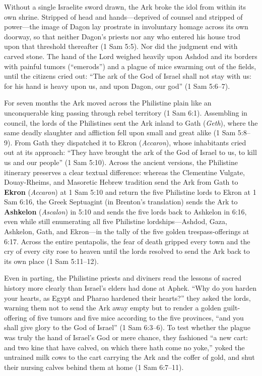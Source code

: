 Without a single Israelite sword drawn, the Ark broke the idol from within its own shrine. Stripped of head and hands---deprived of counsel and stripped of power---the image of Dagon lay prostrate in involuntary homage across its own doorway, so that neither Dagon's priests nor any who entered his house trod upon that threshold thereafter (1 Sam 5:5). Nor did the judgment end with carved stone. The hand of the Lord weighed heavily upon Ashdod and its borders with painful tumors (``emerods'') and a plague of mice swarming out of the fields, until the citizens cried out: ``The ark of the God of Israel shall not stay with us: for his hand is heavy upon us, and upon Dagon, our god'' (1 Sam 5:6--7).

For seven months the Ark moved across the Philistine plain like an unconquerable king passing through rebel territory (1 Sam 6:1). Assembling in council, the lords of the Philistines sent the Ark inland to Gath (\textit{Geth}), where the same deadly slaughter and affliction fell upon small and great alike (1 Sam 5:8--9). From Gath they dispatched it to Ekron (\textit{Accaron}), whose inhabitants cried out at its approach: ``They have brought the ark of the God of Israel to us, to kill us and our people'' (1 Sam 5:10). Across the ancient versions, the Philistine itinerary preserves a clear textual difference: whereas the Clementine Vulgate, Douay-Rheims, and Masoretic Hebrew tradition send the Ark from Gath to \textbf{Ekron} (\textit{Accaron}) at 1 Sam 5:10 and return the five Philistine lords to Ekron at 1 Sam 6:16, the Greek Septuagint (in Brenton's translation) sends the Ark to \textbf{Ashkelon} (\textit{Ascalon}) in 5:10 and sends the five lords back to Ashkelon in 6:16, even while still enumerating all five Philistine lordships---Ashdod, Gaza, Ashkelon, Gath, and Ekron---in the tally of the five golden trespass-offerings at 6:17. Across the entire pentapolis, the fear of death gripped every town and the cry of every city rose to heaven until the lords resolved to send the Ark back to its own place (1 Sam 5:11--12).

Even in parting, the Philistine priests and diviners read the lessons of sacred history more clearly than Israel's elders had done at Aphek. ``Why do you harden your hearts, as Egypt and Pharao hardened their hearts?'' they asked the lords, warning them not to send the Ark away empty but to render a golden guilt-offering of five tumors and five mice according to the five provinces, ``and you shall give glory to the God of Israel'' (1 Sam 6:3--6). To test whether the plague was truly the hand of Israel's God or mere chance, they fashioned ``a new cart: and two kine that have calved, on which there hath come no yoke,'' yoked the untrained milk cows to the cart carrying the Ark and the coffer of gold, and shut their nursing calves behind them at home (1 Sam 6:7--11).

